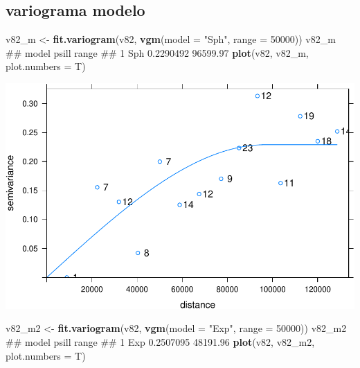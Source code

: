 \documentclass[11pt,]{article}
\newenvironment{Shaded}{\begin{snugshade}}{\end{snugshade}}
\newcommand{\KeywordTok}[1]{\textcolor[rgb]{0.13,0.29,0.53}{\textbf{#1}}}
\newcommand{\DataTypeTok}[1]{\textcolor[rgb]{0.13,0.29,0.53}{#1}}
\newcommand{\DecValTok}[1]{\textcolor[rgb]{0.00,0.00,0.81}{#1}}
\newcommand{\StringTok}[1]{\textcolor[rgb]{0.31,0.60,0.02}{#1}}
\newcommand{\NormalTok}[1]{#1}
\begin{document}
\subsection{variograma modelo}\label{variograma-modelo}

\begin{Shaded}
\begin{Highlighting}[]
\NormalTok{v82_m <-}\StringTok{ }\KeywordTok{fit.variogram}\NormalTok{(v82, }\KeywordTok{vgm}\NormalTok{(}\DataTypeTok{model =} \StringTok{"Sph"}\NormalTok{, }\DataTypeTok{range =} \DecValTok{50000}\NormalTok{))}
\NormalTok{v82_m}
\NormalTok{##   model     psill    range}
\NormalTok{## 1   Sph 0.2290492 96599.97}
\KeywordTok{plot}\NormalTok{(v82, v82_m, }\DataTypeTok{plot.numbers =}\NormalTok{ T)}
\end{Highlighting}
\end{Shaded}

\includegraphics[width=1\linewidth]{img/unnamed-chunk-15-1}

\begin{Shaded}
\begin{Highlighting}[]

\NormalTok{v82_m2 <-}\StringTok{ }\KeywordTok{fit.variogram}\NormalTok{(v82, }\KeywordTok{vgm}\NormalTok{(}\DataTypeTok{model =} \StringTok{"Exp"}\NormalTok{, }\DataTypeTok{range =} \DecValTok{50000}\NormalTok{))}
\NormalTok{v82_m2}
\NormalTok{##   model     psill    range}
\NormalTok{## 1   Exp 0.2507095 48191.96}
\KeywordTok{plot}\NormalTok{(v82, v82_m2, }\DataTypeTok{plot.numbers =}\NormalTok{ T)}
\end{Highlighting}
\end{Shaded}
\end{document}
